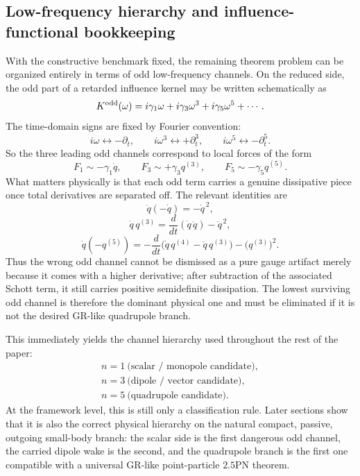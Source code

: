 \documentclass[11pt]{article}
\begin{document}
\subsection{Low-frequency hierarchy and influence-functional bookkeeping}
\label{sec:benchmark-framework-lowfreq}

With the constructive benchmark fixed, the remaining theorem problem can be
organized entirely in terms of odd low-frequency channels.  On the reduced side,
the odd part of a retarded influence kernel may be written schematically as
\[
K^{\rm odd}(\omega)
=
i\gamma_1\omega + i\gamma_3\omega^3 + i\gamma_5\omega^5 + \cdots.
\]
The time-domain signs are fixed by Fourier convention:
\[
i\omega \longleftrightarrow -\partial_t,
\qquad
i\omega^3 \longleftrightarrow +\partial_t^3,
\qquad
i\omega^5 \longleftrightarrow -\partial_t^5.
\]
So the three leading odd channels correspond to local forces of the form
\[
F_1\sim -\gamma_1\dot q,
\qquad
F_3\sim +\gamma_3 q^{(3)},
\qquad
F_5\sim -\gamma_5 q^{(5)}.
\]
What matters physically is that each odd term carries a genuine dissipative piece
once total derivatives are separated off.  The relevant identities are
\[
\dot q(-\dot q)=-\dot q^{\,2},
\]
\[
\dot q\,q^{(3)}
=
\frac{d}{dt}(\dot q\,\ddot q)-\ddot q^{\,2},
\]
\[
\dot q(-q^{(5)})
=
-\frac{d}{dt}\bigl(\dot q\,q^{(4)}-\ddot q\,q^{(3)}\bigr)-\bigl(q^{(3)}\bigr)^2.
\]
Thus the wrong odd channel cannot be dismissed as a pure gauge artifact merely
because it comes with a higher derivative; after subtraction of the associated
Schott term, it still carries positive semidefinite dissipation.  The lowest
surviving odd channel is therefore the dominant physical one and must be
eliminated if it is not the desired GR-like quadrupole branch.

This immediately yields the channel hierarchy used throughout the rest of the
paper:
\[
\boxed{\begin{gathered}
n=1\ \text{(scalar / monopole candidate)},\\
n=3\ \text{(dipole / vector candidate)},\\
n=5\ \text{(quadrupole candidate)}.
\end{gathered}}
\]
At the framework level, this is still only a classification rule.  Later sections
show that it is also the correct physical hierarchy on the natural compact,
passive, outgoing small-body branch: the scalar side is the first dangerous odd
channel, the carried dipole wake is the second, and the quadrupole branch is the
first one compatible with a universal GR-like point-particle $2.5$PN theorem.
\end{document}

